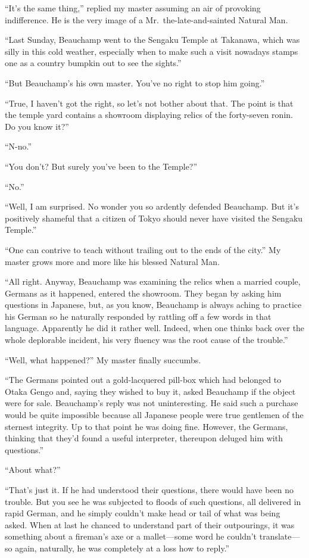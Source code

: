 \documentclass[12pt, openright]{book}
\begin{document}
``It's the same thing,'' replied my master assuming an air of provoking
indifference. He is the very image of a Mr.~the-late-and-sainted Natural
Man.

``Last Sunday, Beauchamp went to the Sengaku Temple at Takanawa, which
was silly in this cold weather, especially when to make such a visit
nowadays stamps one as a country bumpkin out to see the sights.''

``But Beauchamp's his own master. You've no right to stop him going.''

``True, I haven't got the right, so let's not bother about that. The
point is that the temple yard contains a showroom displaying relics of
the forty-seven ronin. Do you know it?''

``N-no.''

``You don't? But surely you've been to the Temple?''

``No.''

``Well, I am surprised. No wonder you so ardently defended Beauchamp.
But it's positively shameful that a citizen of Tokyo should never have
visited the Sengaku Temple.''

``One can contrive to teach without trailing out to the ends of the
city.'' My master grows more and more like his blessed Natural Man.

``All right. Anyway, Beauchamp was examining the relics when a married
couple, Germans as it happened, entered the showroom. They began by
asking him questions in Japanese, but, as you know, Beauchamp is always
aching to practice his German so he naturally responded by rattling off
a few words in that language. Apparently he did it rather well. Indeed,
when one thinks back over the whole deplorable incident, his very
fluency was the root cause of the trouble.''

``Well, what happened?'' My master finally succumbs.

``The Germans pointed out a gold-lacquered pill-box which had belonged
to Otaka Gengo and, saying they wished to buy it, asked Beauchamp if the
object were for sale. Beauchamp's reply was not uninteresting. He said
such a purchase would be quite impossible because all Japanese people
were true gentlemen of the sternest integrity. Up to that point he was
doing fine. However, the Germans, thinking that they'd found a useful
interpreter, thereupon deluged him with questions.''

``About what?''

``That's just it. If he had understood their questions, there would have
been no trouble. But you see he was subjected to floods of such
questions, all delivered in rapid German, and he simply couldn't make
head or tail of what was being asked. When at last he chanced to
understand part of their outpourings, it was something about a fireman's
axe or a mallet---some word he couldn't translate---so again, naturally,
he was completely at a loss how to reply.''
\end{document}
